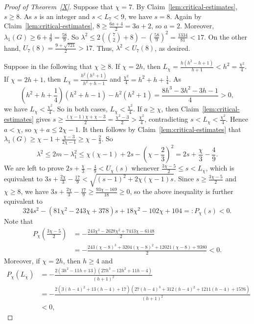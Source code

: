 \documentclass[10pt,a4paper]{amsart}
\begin{document}
\begin{proof}[Proof of Theorem~\ref{X}]
Suppose that $\chi=7$. By Claim~\ref{lem:critical-estimates}, $s\ge8$. As $s$ is an integer and $s<L_7<9$, we have $s=8$. Again by Claim~\ref{lem:critical-estimates},
$8\ge\frac{6a+4}{2}=3a+2$, so $a=2$. Moreover, $\lambda_1(G)\ge6+\frac49=\frac{58}{9}$. So $\lambda^2\le2\left(\binom72+8\right)-\left(\frac{58}{9}\right)^2
 =\frac{1334}{81}<17$. On the other hand, $U_7(8)=\frac{9+\sqrt{721}}2>17$. Thus, $\lambda^2<U_7(8)$, as desired.


Suppose in the following that $\chi\ge8$.
If $\chi=2h$, then
$L_\chi=\frac{h(h^2-h+1)}{h+1}<h^2=\frac{\chi^2}{4}$.
If $\chi=2h+1$, then $L_\chi=\frac{h^2(h^2+1)}{h^2+h-1}$ and $\frac{\chi^2}{4}=h^2+h+\frac14$. As 
$$\left(h^2+h+\frac14\right)(h^2+h-1)-h^2(h^2+1)
 =\frac{8h^3-3h^2-3h-1}{4}>0,$$ we have $L_\chi<\frac{\chi^2}{4}$. So in both cases,  $L_\chi<\frac{\chi^2}{4}$. 
If $a\ge \chi$, then Claim~\ref{lem:critical-estimates} gives
$s\ge\frac{(\chi-1)\chi+\chi-3}{2}=\frac{\chi^2-3}{2}>\frac{\chi^2}{4}$,
contradicting $s<L_\chi<\frac{\chi^2}{4}$. Hence $a<\chi$, so $\chi+a\le2\chi-1$. It then follows by Claim~\ref{lem:critical-estimates} that
$\lambda_1(G)\ge \chi-1+\frac{\chi-3}{2\chi-1}\ge \chi-\frac23$. %
So 
\[
\lambda^2\le 2m-\lambda_1^2\le \chi(\chi-1)+2s-\left(\chi-\frac23\right)^2
 =2s+\frac{\chi}{3}-\frac49. %
\]
We are left  to prove $2s+\frac{\chi}{3}-\frac49<U_\chi(s)$ whenever
$\frac{3\chi-5}{2}\le s<L_\chi$, which is equivalent to $3s+\frac{2\chi}{3}-\frac{17}{9}<\sqrt{(s-1)^2+2\chi(\chi-1)s}$. Since $s\ge \frac{3\chi-5}{2}$ and $\chi\ge 8$, we have $3s+\frac{2\chi}{3}-\frac{17}{9}\ge \frac{93\chi-169}{18}\ge 0$, so the above inequality is further equivalent to \[
324s^2-(81\chi^2-243\chi+378)s+18\chi^2-102\chi+104=:P_\chi(s)<0. 
\]
Note that
\begin{align*}
P_\chi\left(\frac{3\chi-5}{2}\right)&=-\frac{243\chi^3-2628\chi^2+7413\chi-6148}{2}\\
&=-\frac{243(\chi-8)^3+3204(\chi-8)^2+12021(\chi-8)+9380}{2}<0.
\end{align*} %
Moreover, if $\chi=2h$, then $h\ge 4$ and
\begin{align*}
P_{\chi}(L_\chi) &=-\frac{2(3h^2-11h+13)(27h^3-12h^2+11h-4)}{(h+1)^2}\\
&=-\frac{2\left(3(h-4)^2+13(h-4)+17\right)\left(27(h-4)^3+312(h-4)^2+1211(h-4)+1576\right)}{(h+1)^2}\\
&<0,
\end{align*}

\end{proof}
\end{document}
